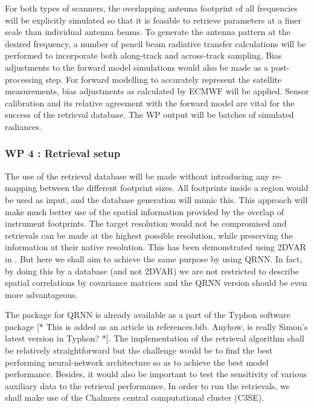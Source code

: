 \documentclass[12pt,oneside,a4paper]{article}
\newcommand\intodo[1]{{\color{red} [* #1 *]}}
\begin{document}
For both types of scanners, the overlapping antenna footprint of all frequencies will be explicitly simulated so that it is feasible to retrieve parameters at a finer scale than individual antenna beams. To generate the antenna pattern at the desired frequency, a number of pencil beam radiative transfer calculations will be performed to incorporate both along-track and across-track sampling. Bias adjustments to the forward model simulations would also be made as a post-processing step. For forward modelling to accurately represent the satellite measurements, bias adjustments as calculated by ECMWF will be applied. Sensor calibration and its relative agreement with the forward model are vital for the success of the retrieval database. 
The WP output will be batches of simulated radiances.

\subsubsection*{WP 4 : Retrieval setup}
%
\label{sec:setup}
The use of the retrieval database will be made without introducing any
re-mapping between the different footprint sizes. All footprints inside a
region would be used as input, and the database generation will mimic this.
This approach will make much better use of the spatial information provided by
the overlap of instrument footprints. The target resolution would not be
compromised and retrievals can be made at the highest possible resolution,
while preserving the information at their native resolution. This has been
demonstrated using 2DVAR in \citet{duncan:onthe:19}. But here we shall aim to
achieve the same purpose by using QRNN. In fact, by doing this by a database
(and not 2DVAR) we are not restricted to describe spatial correlations by
covariance matrices and the QRNN version should be even more advantageous.

The package for QRNN is already available as a part of the Typhon software
package \citep{lemke:2020:typhon}\intodo{This is added as an article in
  references.bib. Anyhow, is really Simon's latest version in Typhon?}. The
implementation of the retrieval algorithm shall be relatively straightforward
but the challenge would be to find the best performing neural-network
architecture so as to achieve the best model performance. Besides, it would
also be important to test the sensitivity of various auxiliary data to the
retrieval performance. In order to run the retrievals, we shall make use of the
Chalmers central computational cluster (C3SE).
\end{document}
